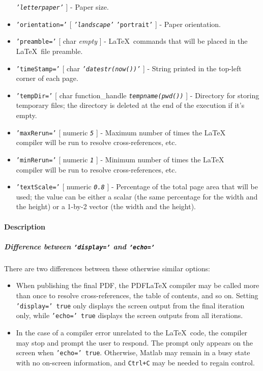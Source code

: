 \begin{itemize}
  \emph{\texttt{'letterpaper'}} {]} - Paper size.
\item
  \texttt{'orientation='} {[} \emph{\texttt{'landscape'}} \textbar{}
  \texttt{'portrait'} {]} - Paper orientation.
\item
  \texttt{'preamble='} {[} char \textbar{} \emph{empty} {]} -
  \LaTeX~commands that will be placed in the \LaTeX~file preamble.
\item
  \texttt{'timeStamp='} {[} char \textbar{}
  \emph{\texttt{'datestr(now())'}} {]} - String printed in the top-left
  corner of each page.
\item
  \texttt{'tempDir='} {[} char \textbar{} function\_handle \textbar{}
  \emph{\texttt{tempname(pwd())}} {]} - Directory for storing temporary
  files; the directory is deleted at the end of the execution if it's
  empty.
\item
  \texttt{'maxRerun='} {[} numeric \textbar{} \emph{\texttt{5}} {]} -
  Maximum number of times the \LaTeX\\compiler will be run to resolve
  cross-references, etc.
\item
  \texttt{'minRerun='} {[} numeric \textbar{} \emph{\texttt{1}} {]} -
  Minimum number of times the \LaTeX\\compiler will be run to resolve
  cross-references, etc.
\item
  \texttt{'textScale='} {[} numeric \textbar{} \emph{\texttt{0.8}} {]} -
  Percentage of the total page area that will be used; the value can be
  either a scalar (the same percentage for the width and the height) or
  a 1-by-2 vector (the width and the height).
\end{itemize}

\paragraph{Description}\label{description}

\subparagraph{Difference between \texttt{'display='} and
\texttt{'echo='}}\label{difference-between-display-and-echo}

There are two differences between these otherwise similar options:

\begin{itemize}
\item
  When publishing the final PDF, the PDFLaTeX compiler may be called
  more than once to resolve cross-references, the table of contents, and
  so on. Setting \texttt{'display=' true} only displays the screen
  output from the final iteration only, while \texttt{'echo=' true}
  displays the screen outputs from all iterations.
\item
  In the case of a compiler error unrelated to the \LaTeX~code, the
  compiler may stop and prompt the user to respond. The prompt only
  appears on the screen when \texttt{'echo=' true}. Otherwise, Matlab
  may remain in a busy state with no on-screen information, and
  \texttt{Ctrl+C} may be needed to regain control.
\end{itemize}

